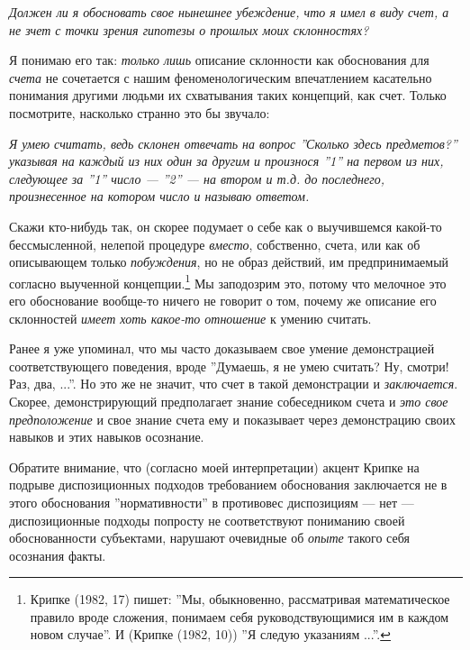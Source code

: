 \documentclass[11pt]{book}
\begin{document}
\smallskip

\textit{Должен ли я обосновать свое нынешнее убеждение, что я имел в виду счет, а не зчет с точки зрения гипотезы о прошлых моих склонностях?}

\smallskip

Я понимаю его так: \textit{только лишь} описание склонности как обоснования для \textit{счета} не сочетается с нашим феноменологическим впечатлением касательно понимания другими людьми их схватывания таких концепций, как счет. Только посмотрите, насколько странно это бы звучало:

\smallskip

\textit{Я умею считать, ведь склонен отвечать на вопрос ''Сколько здесь предметов?'' указывая на каждый из них один за другим и произнося ''1'' на первом из них, следующее за ''1'' число --- ''2'' --- на втором и т.д. до последнего, произнесенное на котором число и называю ответом.}

\smallskip

Скажи кто-нибудь так, он скорее подумает о себе как о выучившемся какой-то бессмысленной, нелепой процедуре \textit{вместо}, собственно, счета, или как об описывающем только \textit{побуждения}, но не образ действий, им предпринимаемый согласно выученной концепции.\footnote{Крипке (1982, 17) пишет: ''Мы, обыкновенно, рассматривая математическое правило вроде сложения, понимаем себя руководствующимися им в каждом новом случае''. И (Крипке (1982, 10)) ''Я следую указаниям ...''.} Мы заподозрим это, потому что мелочное это его обоснование вообще-то ничего не говорит о том, почему же описание его склонностей \textit{имеет хоть какое-то отношение} к умению считать.

Ранее я уже упоминал, что мы часто доказываем свое умение демонстрацией соответствующего поведения, вроде ''Думаешь, я не умею считать? Ну, смотри! Раз, два, ...''. Но это же не значит, что счет в такой демонстрации и \textit{заключается}. Скорее, демонстрирующий предполагает знание собеседником счета и \textit{это свое предположение} и свое знание счета ему и показывает через демонстрацию своих навыков и этих навыков осознание.

Обратите внимание, что (согласно моей интерпретации) акцент Крипке на подрыве диспозиционных подходов требованием обоснования заключается не в этого обоснования ''нормативности'' в противовес диспозициям --- нет --- диспозиционные подходы попросту не соответствуют пониманию своей обоснованности субъектами, нарушают очевидные об \textit{опыте} такого себя осознания факты.
\end{document}
